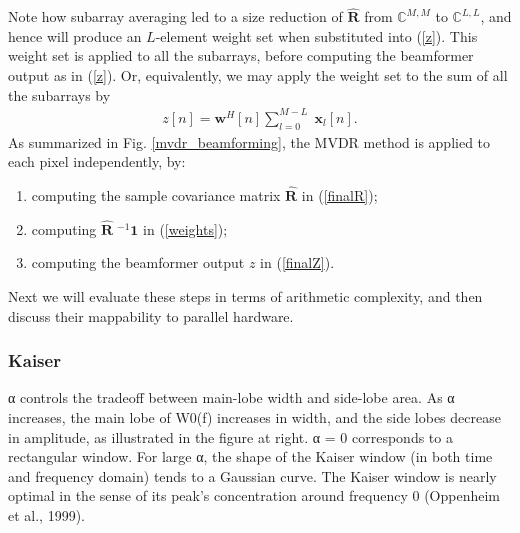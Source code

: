 \documentclass[10pt,journal,draftclsnofoot,onecolumn]{IEEEtran}
\let\MYoriglatexcaption\caption               %
\renewcommand{\caption}[2][\relax]{\MYoriglatexcaption[#2]{#2}}
\newcommand\sumb[2]{\sum\limits_{#1}^{#2}\;}
\renewcommand\H{^{\scriptscriptstyle H}}
\renewcommand\vec[1]{\boldsymbol{#1}}
\newcommand\mat[1]{\boldsymbol{#1}}
\newcommand\1{\vec 1}
\newcommand*\w{\vec w}
\newcommand*\x{\vec x}
\newcommand*\eR{\mat{\hat R}}
\newcommand*\eRi{\hat{\mat R}\;\!^{-1}}
\begin{document}
Note how subarray averaging led to a size reduction of $\eR$ from $\mathbb{C}^{M,M}$ to $\mathbb{C}^{L,L}$, and hence will produce an $L$-element weight set when substituted into (\ref{z}). This weight set is applied to all the subarrays, before computing the beamformer output as in (\ref{z}). Or, equivalently, we may apply the weight set to the sum of all the subarrays by
\begin{align}
z[n] = \w\H[n] \sumb{l=0}{M-L} \x_l[n].\label{finalZ}
\end{align}
As summarized in Fig. \ref{mvdr_beamforming}, the MVDR method is applied to each pixel independently, by:
\begin{enumerate}
\item computing the sample covariance matrix $\eR$ in (\ref{finalR});
\item computing $\eRi\1$ in (\ref{weights});
\item computing the beamformer output $z$ in (\ref{finalZ}).
\end{enumerate}
Next we will evaluate these steps in terms of arithmetic complexity, and then discuss their mappability to parallel hardware.

\subsubsection{Kaiser}

α controls the tradeoff between main-lobe width and side-lobe area.  As α increases, the main lobe of W0(f) increases in width, and the side lobes decrease in amplitude, as illustrated in the figure at right.  α = 0 corresponds to a rectangular window. For large α, the shape of the Kaiser window (in both time and frequency domain) tends to a Gaussian curve.  The Kaiser window is nearly optimal in the sense of its peak's concentration around frequency 0 (Oppenheim et al., 1999).
\end{document}
